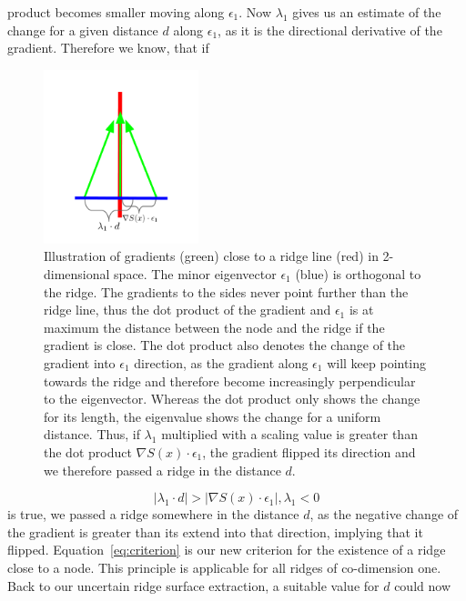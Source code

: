 product becomes smaller moving along $\epsilon_1$. Now $\lambda_1$ gives
us an estimate of the change for a given distance $d$ along
$\epsilon_1$, as it is the directional derivative of the gradient.
Therefore we know, that if
\begin{figure}[ht]
    \centering
    \includegraphics[trim=0 40 0 50, clip=true, width=0.4\textwidth]{Images/criterion.pdf}
    \caption{Illustration of gradients (green) close to a ridge line
    (red) in 2-dimensional space. The minor eigenvector $\epsilon_1$
    (blue) is orthogonal to the ridge. The gradients to the sides never
    point further than the ridge line, thus the dot product of the
    gradient and $\epsilon_1$ is at maximum the distance between the
    node and the ridge if the gradient is close. The dot product also
    denotes the change of the gradient into $\epsilon_1$ direction, as
    the gradient along $\epsilon_1$ will keep pointing towards the ridge
    and therefore become increasingly perpendicular to the eigenvector.
    Whereas the dot product only shows the change for its length, the
    eigenvalue shows the change for a uniform distance. Thus, if
    $\lambda_1$ multiplied with a scaling value is greater than the dot
    product $\nabla S(x) \cdot \epsilon_1$, the gradient flipped its
    direction and we therefore passed a ridge in the distance $d$.}
    \label{fig:criterion}
\end{figure}
\begin{equation}\label{eq:criterion}
    |\lambda_1 \cdot d| > |\nabla S(x) \cdot \epsilon_1|,\lambda_1 < 0
\end{equation}
is true, we passed a ridge somewhere in the distance $d$, as the
negative change of the gradient is greater than its extend into that
direction, implying that it flipped. Equation~\ref{eq:criterion} is our
new criterion for the existence of a ridge close to a node. This
principle is applicable for all ridges of co-dimension one. Back to our
uncertain ridge surface extraction, a suitable value for $d$ could now
